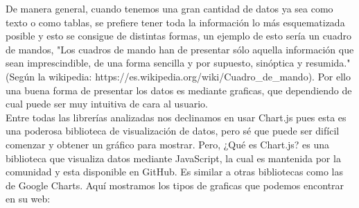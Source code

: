 \documentclass[a4paper, 11pt]{article}
\begin{document}
\begin{itemize}
          De manera general, cuando tenemos una gran cantidad de datos ya sea
          como texto o como tablas, se prefiere tener toda la información lo
          más esquematizada posible y esto se consigue de distintas formas, un
          ejemplo de esto sería un cuadro de mandos, "Los cuadros de mando han
          de presentar sólo aquella información que sean imprescindible, de una
          forma sencilla y por supuesto, sinóptica y resumida." (Según la
          wikipedia: https://es.wikipedia.org/wiki/Cuadro_de_mando). Por ello
          una buena forma de presentar los datos es mediante graficas, que
          dependiendo de cual puede ser muy intuitiva de cara al usuario.\\

          Entre todas las librerías analizadas nos declinamos en usar Chart.js
          pues esta es una poderosa biblioteca de visualización de datos, pero
          sé que puede ser difícil comenzar y obtener un gráfico para mostrar.
          Pero, ¿Qué es Chart.js? es una biblioteca que visualiza datos mediante
          JavaScript, la cual es mantenida por la comunidad y esta disponible
          en GitHub. Es similar a otras bibliotecas como las de Google Charts.
          Aquí mostramos los tipos de graficas que podemos encontrar en su web:\\


\end{itemize}
\end{document}
